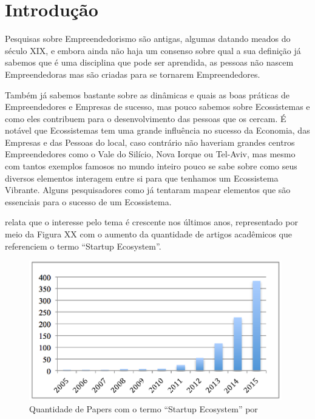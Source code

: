 \chapter{Introdução}
\label{cap-introducao}

Pesquisas sobre Empreendedorismo são antigas, algumas datando meados do século XIX, e embora ainda não haja um consenso sobre qual a sua definição já sabemos que é uma disciplina que pode ser aprendida, as pessoas não nascem Empreendedoras mas são criadas para se tornarem Empreendedores. 

Também já sabemos bastante sobre as dinâmicas e quais as boas práticas de Empreendedores e Empresas de sucesso, mas pouco sabemos sobre Ecossistemas e como eles contribuem para o desenvolvimento das pessoas que os cercam. É notável que Ecossistemas tem uma grande influência no sucesso da Economia, das Empresas e das Pessoas do local, caso contrário não haveriam grandes centros Empreendedores como o Vale do Silício, Nova Iorque ou Tel-Aviv, mas mesmo com tantos exemplos famosos no mundo inteiro pouco se sabe sobre como seus diversos elementos interagem entre si para que tenhamos um Ecossistema Vibrante. Alguns pesquisadores como  já tentaram mapear elementos que são essenciais para o sucesso de um Ecossistema.

 relata que o interesse pelo tema é crescente nos últimos anos, representado por meio da Figura XX com o aumento da quantidade de artigos acadêmicos que referenciem o termo ``Startup Ecosystem''.

\begin{figure}[!htb]
\centering
\includegraphics[width=11cm,angle=0]{figuras/papers_about_startup_ecosystems}
\caption{Quantidade de Papers com o termo ``Startup Ecosystem'' por }
\label{figure:papers_about_startup_ecosystems}
\end{figure}

